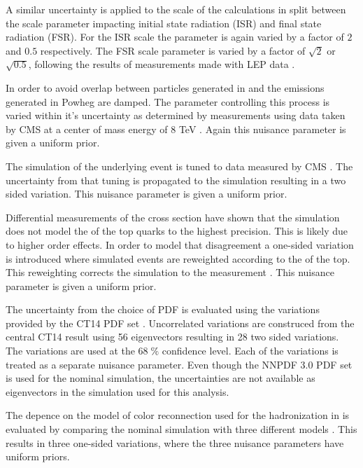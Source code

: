 A similar uncertainty is applied to the scale of the calculations in \PYTHIA split between the scale parameter impacting initial state radiation (ISR) and final state radiation (FSR). 
For the ISR scale the parameter is again varied by a factor of $2$ and $0.5$ respectively. The FSR scale parameter is varied by a factor of $\sqrt{2}$ or $\sqrt{0.5}$, following the results
of measurements made with LEP data \cite{Skands:2014pea}.

In order to avoid overlap between particles generated in \POWHEG and \PYTHIA the emissions generated in Powheg are damped. The parameter controlling this process is varied within it's uncertainty
as determined by measurements using data taken by CMS at a center of mass energy of 8 TeV \cite{CMS-PAS-TOP-16-021}.
Again this nuisance parameter is given a uniform prior.

The simulation of the underlying event is tuned to data measured by CMS \cite{CMS-PAS-TOP-16-021}. The uncertainty from that tuning is propagated to the simulation resulting in a two sided variation.
This nuisance parameter is given a uniform prior.

Differential measurements of the \ttbar cross section \cite{CMS-PAS-TOP-16-011} have shown that the simulation does not model the \pt of the top quarks to the highest precision.
This is likely due to higher order effects. In order to model that disagreement a one-sided variation is introduced where simulated events are reweighted according to the \pt of the top.
This reweighting corrects the simulation to the measurement \cite{CMS-PAS-TOP-16-011}. This nuisance parameter is given a uniform prior.

The uncertainty from the choice of PDF is evaluated using the variations provided by the CT14 PDF set \cite{Dulat:2015mca}. Uncorrelated variations are construced from the central CT14 result using 56 eigenvectors resulting in 28 two sided variations.
The variations are used at the $68 \;\%$ confidence level. Each of the variations is treated as a separate nuisance parameter.
Even though the NNPDF 3.0 PDF set is used for the nominal simulation, the uncertainties are not available as eigenvectors in the simulation used for this analysis.

The depence on the model of color reconnection used for the hadronization in \PYTHIA is evaluated by comparing the nominal simulation with three different models \cite{Argyropoulos:2014zoa,Christiansen:2015yqa}. This results in three one-sided variations, where the three nuisance parameters have uniform priors.









